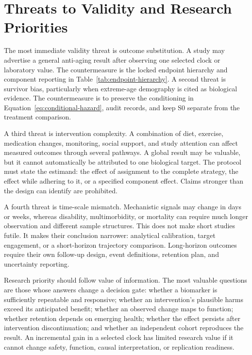 \documentclass[10pt,conference]{IEEEtran}
\begin{document}
\section{Threats to Validity and Research Priorities}
\label{sec:validity}

The most immediate validity threat is outcome substitution. A study may advertise a general anti-aging result after observing one selected clock or laboratory value. The countermeasure is the locked endpoint hierarchy and component reporting in Table~\ref{tab:endpoint-hierarchy}. A second threat is survivor bias, particularly when extreme-age demography is cited as biological evidence. The countermeasure is to preserve the conditioning in Equation~\eqref{eq:conditional-hazard}, audit records, and keep S0 separate from the treatment comparison.

A third threat is intervention complexity. A combination of diet, exercise, medication changes, monitoring, social support, and study attention can affect measured outcomes through several pathways. A global result may be valuable, but it cannot automatically be attributed to one biological target. The protocol must state the estimand: the effect of assignment to the complete strategy, the effect while adhering to it, or a specified component effect. Claims stronger than the design can identify are prohibited.

A fourth threat is time-scale mismatch. Mechanistic signals may change in days or weeks, whereas disability, multimorbidity, or mortality can require much longer observation and different sample structures. This does not make short studies futile. It makes their conclusion narrower: analytical calibration, target engagement, or a short-horizon trajectory comparison. Long-horizon outcomes require their own follow-up design, event definitions, retention plan, and uncertainty reporting.

Research priority should follow value of information. The most valuable questions are those whose answers change a decision gate: whether a biomarker is sufficiently repeatable and responsive; whether an intervention's plausible harms exceed its anticipated benefit; whether an observed change maps to function; whether retention depends on emerging health; whether the effect persists after intervention discontinuation; and whether an independent cohort reproduces the result. An incremental gain in a selected clock has limited research value if it cannot change safety, function, causal interpretation, or replication readiness.
\end{document}
